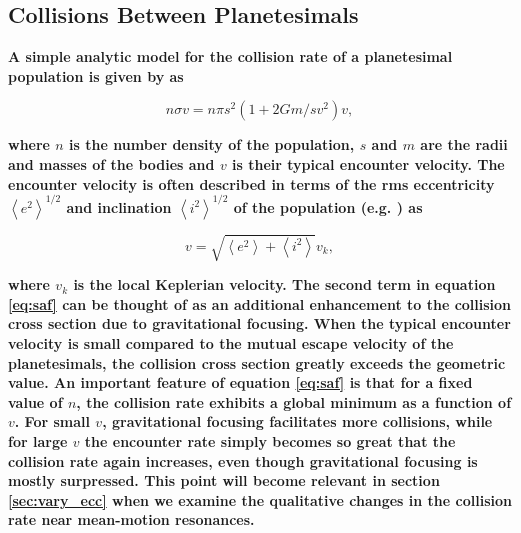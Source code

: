\documentclass[fleqn,usenatbib]{mnras}
\begin{document}



\subsection{Collisions Between Planetesimals}\label{sec:colleq}

\textbf{A simple analytic model for the collision rate of a planetesimal population is given by \citet{1969edo..book.....S} as}

\begin{equation}\label{eq:saf}
	n \sigma v = n \pi s^{2} \left( 1 + 2 G m / s v^{2} \right) v,
\end{equation}

\noindent\textbf{where $n$ is the number density of the population, $s$ and $m$ are the radii and masses of the bodies and $v$ is their typical encounter velocity. The encounter velocity is often described in terms of the rms eccentricity $\left<e^{2}\right>^{1/2}$ and inclination $\left<i^{2}\right>^{1/2}$ of the population (e.g. \citet{1993ARA&A..31..129L}) as}

\begin{equation}\label{eq:eccincvel}
	v = \sqrt{\left< e^{2} \right> + \left< i^{2} \right>} v_{k},
\end{equation}

\noindent\textbf{where $v_{k}$ is the local Keplerian velocity. The second term in equation \ref{eq:saf} can be thought of as an additional enhancement to the collision cross section due to 
gravitational focusing. When the typical encounter velocity is small compared to the mutual escape velocity of the planetesimals, the collision cross section greatly exceeds the geometric 
value. An important feature of equation \ref{eq:saf} is that for a fixed value of $n$, the collision rate exhibits a global minimum as a function of $v$. For small $v$, gravitational focusing 
facilitates more collisions, while for large $v$ the encounter rate simply becomes so great that the collision rate again increases, even though gravitational focusing is mostly surpressed. 
This point will become relevant in section \ref{sec:vary_ecc} when we examine the qualitative changes in the collision rate near mean-motion resonances.}
\end{document}
